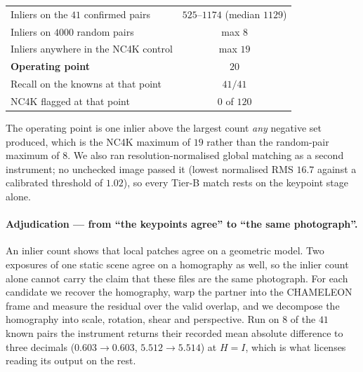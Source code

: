 \documentclass{article} %
\begin{document}
\begin{center}\small
\begin{tabular}{lc}
\toprule
Inliers on the $41$ confirmed pairs & $525$--$1174$ (median $1129$) \\
Inliers on $4000$ random pairs & max $8$ \\
Inliers anywhere in the NC4K control & max $19$ \\
\textbf{Operating point} & \textbf{$20$} \\
Recall on the knowns at that point & $41/41$ \\
NC4K flagged at that point & $0$ of $120$ \\
\bottomrule
\end{tabular}
\end{center}

The operating point is one inlier above the largest count \emph{any} negative set produced, which is
the NC4K maximum of $19$ rather than the random-pair maximum of $8$. We also ran resolution-normalised
global matching as a second instrument; no unchecked image passed it (lowest normalised RMS $16.7$
against a calibrated threshold of $1.02$), so every Tier-B match rests on the keypoint stage alone.

\paragraph{Adjudication --- from ``the keypoints agree'' to ``the same photograph''.} An inlier count
shows that local patches agree on a geometric model. Two exposures of one static scene agree on a
homography as well, so the inlier count alone cannot carry the claim that these files are the same
photograph. For each candidate we recover the homography, warp the partner into the CHAMELEON frame
and measure the residual over the valid overlap, and we decompose the homography into scale,
rotation, shear and perspective. Run on $8$ of the $41$ known pairs the instrument returns their
recorded mean absolute difference to three decimals ($0.603 \to 0.603$, $5.512 \to 5.514$) at
$H = I$, which is what licenses reading its output on the rest.
\end{document}
